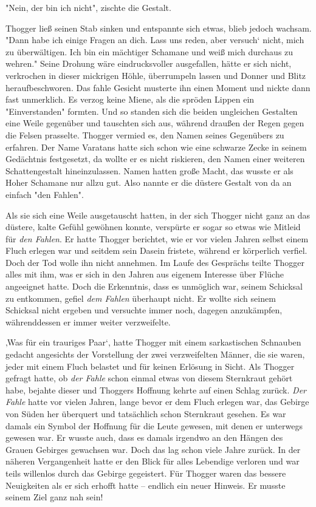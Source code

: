 \documentclass[10pt, a4paper, oneside]{book}
\begin{document}
\begin{multicols}{2}
"Nein, der bin ich nicht", zischte die Gestalt.\bigskip

Thogger ließ seinen Stab sinken und entspannte sich etwas, blieb jedoch wachsam. "Dann habe ich einige Fragen an dich. Lass uns reden, aber versuch‘ nicht, mich zu überwältigen. Ich bin ein mächtiger Schamane und weiß mich durchaus zu wehren." Seine Drohung wäre eindrucksvoller ausgefallen, hätte er sich nicht, verkrochen in dieser mickrigen Höhle, überrumpeln lassen und Donner und Blitz heraufbeschworen. Das fahle Gesicht musterte ihn einen Moment und nickte dann fast unmerklich. Es verzog keine Miene, als die spröden Lippen ein "Einverstanden" formten. Und so standen sich die beiden ungleichen Gestalten eine Weile gegenüber und tauschten sich aus, während draußen der Regen gegen die Felsen prasselte. Thogger vermied es, den Namen seines Gegenübers zu erfahren. Der Name Varatans hatte sich schon wie eine schwarze Zecke in seinem Gedächtnis festgesetzt, da wollte er es nicht riskieren, den Namen einer weiteren Schattengestalt hineinzulassen. Namen hatten große Macht, das wusste er als Hoher Schamane nur allzu gut. Also nannte er die düstere Gestalt von da an einfach "den Fahlen".\bigskip

Als sie sich eine Weile ausgetauscht hatten, in der sich Thogger nicht ganz an das düstere, kalte Gefühl gewöhnen konnte, verspürte er sogar so etwas wie Mitleid für \textit{den Fahlen}. Er hatte Thogger berichtet, wie er vor vielen Jahren selbst einem Fluch erlegen war und seitdem sein Dasein fristete, während er körperlich verfiel. Doch der Tod wolle ihn nicht annehmen. Im Laufe des Gesprächs teilte Thogger alles mit ihm, was er sich in den Jahren aus eigenem Interesse über Flüche angeeignet hatte. Doch die Erkenntnis, dass es unmöglich war, seinem Schicksal zu entkommen, gefiel \textit{dem Fahlen} überhaupt nicht. Er wollte sich seinem Schicksal nicht ergeben und versuchte immer noch, dagegen anzukämpfen, währenddessen er immer weiter verzweifelte.\bigskip

‚Was für ein trauriges Paar‘, hatte Thogger mit einem sarkastischen Schnauben gedacht angesichts der Vorstellung der zwei verzweifelten Männer, die sie waren, jeder mit einem Fluch belastet und für keinen Erlösung in Sicht. Als Thogger gefragt hatte, ob \textit{der Fahle} schon einmal etwas von diesem Sternkraut gehört habe, bejahte dieser und Thoggers Hoffnung kehrte auf einen Schlag zurück. \textit{Der Fahle} hatte vor vielen Jahren, lange bevor er dem Fluch erlegen war, das Gebirge von Süden her überquert und tatsächlich schon Sternkraut gesehen. Es war damals ein Symbol der Hoffnung für die Leute gewesen, mit denen er unterwegs gewesen war. Er wusste auch, dass es damals irgendwo an den Hängen des Grauen Gebirges gewachsen war. Doch das lag schon viele Jahre zurück. In der näheren Vergangenheit hatte er den Blick für alles Lebendige verloren und war teils willenlos durch das Gebirge gegeistert. Für Thogger waren das bessere Neuigkeiten als er sich erhofft hatte – endlich ein neuer Hinweis. Er musste seinem Ziel ganz nah sein!\bigskip


\end{multicols}
\end{document}

